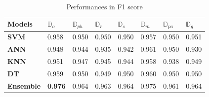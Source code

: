 \documentclass[10pt,journal,compsoc]{IEEEtran}
\begin{document}
\begin{table}[ht]
\begin{adjustwidth}{-1cm}{}
\begin{tabular}{|C{1.4cm}|C{0.7cm}|C{0.7cm}|C{0.7cm}|C{0.7cm}|C{0.7cm}|C{0.7cm}|C{0.7cm}|}
\hline
{} 
{\color[HTML]{000000} \textbf{Models}} & {\color[HTML]{000000} \textbf{$\mathbb{D}_{o}$}} & {\color[HTML]{000000} \textbf{$\mathbb{D}_{ph}$}} & {\color[HTML]{000000} \textbf{$\mathbb{D}_{r}$}} & {\color[HTML]{000000} \textbf{$\mathbb{D}_{s}$}} & {\color[HTML]{000000} \textbf{$\mathbb{D}_{m}$}} & {\color[HTML]{000000} \textbf{$\mathbb{D}_{pa}$}} & {\color[HTML]{000000} \textbf{$\mathbb{D}_{g}$}}  \\ \hline
{} 
\textbf{SVM} & 0.958  & 0.950 & 0.950  & 0.950  & 0.957  & 0.950 & 0.951 \\ \hline
{} 
\textbf{ANN} & 0.948  & 0.944  & 0.935  & 0.942 & 0.961 & 0.950 & 0.930 \\ \hline
{} 
\textbf{KNN} & 0.951  & 0.947 & 0.945 & 0.944 & 0.958 & 0.938 & 0.949 \\ \hline
{} 
\textbf{DT} & 0.959 & 0.950  & 0.949 & 0.950  & 0.960  & 0.950 & 0.950  \\ \hline
{} 
\textbf{Ensemble}  & \textbf{0.976}  & 0.964  & 0.963  & 0.964 & 0.975 & 0.961 & 0.964  \\ \hline
\end{tabular}
\caption{Performances in F1 score}
\label{F1}
\end{adjustwidth}
\end{table}
%
\end{document}
